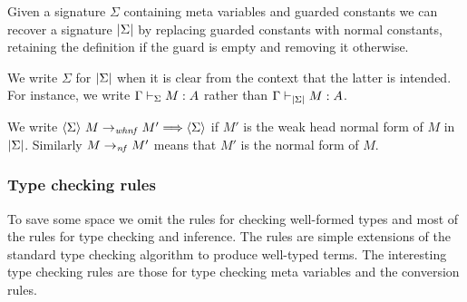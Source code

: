 \begin{definition}
    Given a signature $\Sigma$ containing meta variables and guarded constants
    we can recover a {\Core} signature $\left|{\Sigma}\right|$ by replacing guarded
    constants with normal constants, retaining the definition if the guard is
    empty and removing it otherwise.
\end{definition}

We write $\Sigma$ for $\left|{\Sigma}\right|$ when it is clear from the context that
the latter is intended. For instance, we write ${\Gamma} \vdash_{\Sigma} {M} : {A}$
rather than ${\Gamma} \vdash_{\left|{\Sigma}\right|} {M} : {A}$.

We write $\langle {\Sigma} \rangle ~ {{M} \to_{\mathit{whnf}} {M'}} \Longrightarrow \langle {\Sigma} \rangle$ if $M'$ is the weak
head normal form of $M$ in $\left|{\Sigma}\right|$. Similarly ${M} \to_{\mathit{nf}} {M'}$
means that $M'$ is the normal form of $M$.

\subsubsection{Type checking rules}

To save some space we omit the rules for checking well-formed types and most of
the rules for type checking and inference. The rules are simple extensions of
the standard type checking algorithm to produce
well-typed terms. The interesting type checking rules are those for type
checking meta variables and the conversion rules.


